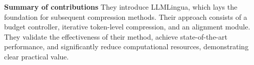 \documentclass[11pt]{article}
\newcommand{\todo}[1]{\textcolor{orange}{[TODO: #1]}}
\begin{document}



\noindent\textbf{Summary of contributions} They introduce LLMLingua, which lays the foundation for subsequent compression methods. Their approach consists of a budget controller, iterative token-level compression, and an alignment module. They validate the effectiveness of their method, achieve state-of-the-art performance, and significantly reduce computational resources, demonstrating clear practical value.



\end{document}
